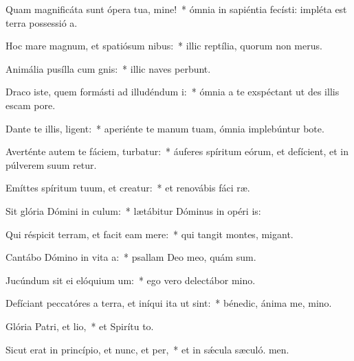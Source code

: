 \item Quam magnificáta sunt ópera tua, mine!~* ómnia in sapiéntia fecísti: impléta est terra possessió a.
\item Hoc mare magnum, et spatiósum nibus:~* illic reptília, quorum non  merus.
\item Animália pusílla cum gnis:~* illic naves perbunt.
\item Draco iste, quem formásti ad illudéndum i:~* ómnia a te exspéctant ut des illis escam  pore.
\item Dante te illis, ligent:~* aperiénte te manum tuam, ómnia implebúntur bote.
\item Averténte autem te fáciem, turbatur:~* áuferes spíritum eórum, et defícient, et in púlverem suum retur.
\item Emíttes spíritum tuum, et creatur:~* et renovábis fáci ræ.
\item Sit glória Dómini in culum:~* lætábitur Dóminus in opéri is:
\item Qui réspicit terram, et facit eam mere:~* qui tangit montes,  migant.
\item Cantábo Dómino in vita a:~* psallam Deo meo, quám sum.
\item Jucúndum sit ei elóquium um:~* ego vero delectábor  mino.
\item Defíciant peccatóres a terra, et iníqui ita ut  sint:~* bénedic, ánima me, mino.
\item Glória Patri, et lio,~* et Spirítu to.
\item Sicut erat in princípio, et nunc, et per,~* et in sǽcula sæculó. men.
